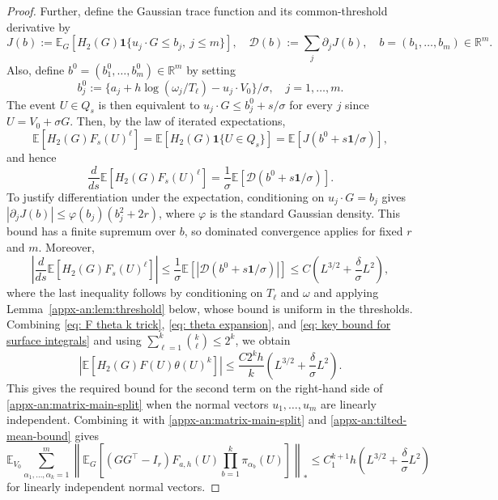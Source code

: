\documentclass[11pt,letterpaper]{article}
\theoremstyle{remark}
\newcommand{\E}{\mathbb E}
\newcommand{\R}{\mathbb R}
\newcommand{\ind}{\mathbf 1}
\begin{document}
\begin{proof}
\begingroup
Further, define the
Gaussian trace function and its common-threshold derivative by
\begin{equation}
 J(b):=\E_G[H_2(G)\ind\{u_j\cdot G\le b_j,\ j\le m\}],
 \quad \mathcal D(b):=\sum_j\partial_jJ(b),\quad b=(b_1,\dots,b_m)\in\R^m.
 \label{appx-an:threshold-functions}
\end{equation}
Also, define $b^0 = (b_1^0,\dots,b_m^0)\in\R^m$ by setting
\[
 b_j^0:=\{a_j+h\log(\omega_j/T_\ell)-u_j\cdot V_0\}/\sigma,\quad j=1,\dots, m.
\]
The event \(U\in Q_s\) is then equivalent to
\(u_j\cdot G\le b_j^0+s/\sigma\) for every \(j\) since $U = V_0 + \sigma G$. 
Then, by the law of iterated expectations,
\[
 \E[H_2(G)F_s(U)^\ell] = \E[H_2(G)\ind\{U\in Q_s\}]
 =\E[J(b^0+s\mathbf1/\sigma)],
\]
and hence
\[
 \frac{d}{ds}\E[H_2(G)F_s(U)^\ell]
 =\frac1\sigma\E[\mathcal D(b^0+s\mathbf1/\sigma)].
\]
To justify differentiation under the expectation, conditioning on
$u_j\cdot G=b_j$ gives
$|\partial_jJ(b)|\le\varphi(b_j)(b_j^2+2r)$, where $\varphi$ is the
standard Gaussian density. This bound has a finite supremum over $b$,
so dominated convergence applies for fixed $r$ and $m$. Moreover,
\begin{equation}\label{eq: key bound for surface integrals}
 \left|\frac{d}{ds}\E[H_2(G)F_s(U)^\ell]\right|
 \le\frac1\sigma\E[|\mathcal D(b^0+s\mathbf1/\sigma)|]
 \le C\left(L^{3/2}+\frac\delta\sigma L^2\right),
\end{equation}
where the last inequality follows by conditioning on $T_\ell$ and
$\omega$ and applying Lemma~\ref{appx-an:lem:threshold} below, whose
bound is uniform in the thresholds. Combining \eqref{eq: F theta k trick}, \eqref{eq: theta expansion}, and \eqref{eq: key bound for surface integrals} and using
\(\sum_{\ell=1}^k\binom{k}{\ell}\le2^k\), we obtain
\[
 \left|\E[H_2(G)F(U)\theta(U)^k]\right|
 \le\frac{C2^kh}{k}
       \left(L^{3/2}+\frac\delta\sigma L^2\right).
\]
This gives the required bound for the second term on the right-hand side of \eqref{appx-an:matrix-main-split} when the normal vectors $u_1,\dots, u_m$ are linearly independent. Combining it with \eqref{appx-an:matrix-main-split} and
\eqref{appx-an:tilted-mean-bound} gives
\begin{equation}
 \E_{V_0}\sum_{\alpha_1,\ldots,\alpha_k=1}^m
 \left\|\E_G\left[(GG^\top-I_r)F_{a,h}(U)
              \prod_{b=1}^k\pi_{\alpha_b}(U)\right]\right\|_*
 \le C_1^{k+1}h\left(L^{3/2}+\frac\delta\sigma L^2\right)
 \label{appx-an:matrix-bound-unsimplified}
\end{equation}
for linearly independent normal vectors.




\end{proof}
\end{document}
